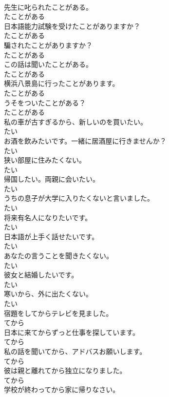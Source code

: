 \documentclass[8pt]{extreport}
\begin{document}
\begin{CJK}{UTF8}{min}
\\	先生に叱られたことがある。	
\\	たことがある
\\	日本語能力試験を受けたことがありますか？	
\\	たことがある
\\	騙されたことがありますか？	
\\	たことがある
\\	この話は聞いたことがある。	
\\	たことがある
\\	横浜八景島に行ったことがあります。	
\\	たことがある
\\	うそをついたことがある？	
\\	たことがある
\\	私の車が古すぎるから、新しいのを買いたい。	
\\	たい
\\	お酒を飲みたいです。一緒に居酒屋に行きませんか？	
\\	たい
\\	狭い部屋に住みたくない。	
\\	たい
\\	帰国したい。両親に会いたい。	
\\	たい
\\	うちの息子が大学に入りたくないと言いました。	
\\	たい
\\	将来有名人になりたいです。	
\\	たい
\\	日本語が上手く話せたいです。	
\\	たい
\\	あなたの言うことを聞きたくない。	
\\	たい
\\	彼女と結婚したいです。	
\\	たい
\\	寒いから、外に出たくない。	
\\	たい
\\	宿題をしてからテレビを見ました。	
\\	てから
\\	日本に来てからずっと仕事を探しています。	
\\	てから
\\	私の話を聞いてから、アドバスお願いします。	
\\	てから
\\	彼は親と離れてから独立になりました。	
\\	てから
\\	学校が終わってから家に帰りなさい。	

\end{CJK}
\end{document}
